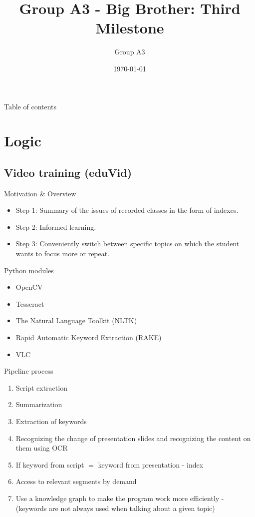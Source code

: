 \documentclass[xcolor=x11names,table]{beamer}
\title[\textcolor{white}{Third Milestone}]
{Group A3 - Big Brother: Third Milestone}
\author{Group A3}
\institute[TU Berlin]{TU Berlin}
\date{\today}
\begin{document}
\begin{frame}
\titlepage
\end{frame}

\begin{frame}{Table of contents}
\tableofcontents
\end{frame}



\section{Logic}

\title[\textcolor{white}{Milosz}]{}
\subsection{Video training (eduVid)}
\begin{frame}{Motivation \& Overview}
\begin{itemize}
    \item Step 1: Summary of the issues of recorded classes in the form of
    indexes.
    \item Step 2: Informed learning.
    \item Step 3: Conveniently switch between specific topics on 
    which the student wants to focus more or repeat.
\end{itemize}
\end{frame}

\begin{frame}{Python modules}
\begin{itemize}
    \item OpenCV
    \item Tesseract
    \item The Natural Language Toolkit (NLTK)
    \item Rapid Automatic Keyword Extraction (RAKE)
    \item VLC
\end{itemize}
\end{frame}

\begin{frame}{Pipeline process}
\begin{enumerate}
    \item Script extraction
    \item Summarization
    \item Extraction of keywords
    \item Recognizing the change of presentation slides and recognizing
    the content on them using OCR
    \item If keyword from script $=$ keyword from presentation -
    index
    \item Access to relevant segments by demand
    \item Use a knowledge graph to make the program work more efficiently
    - (keywords are not always used when talking about a given topic)
\end{enumerate}
\end{frame}
\end{document}
